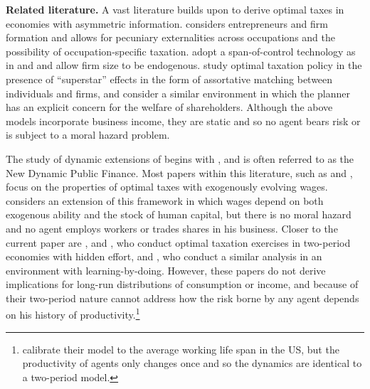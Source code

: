 \documentclass[11pt]{article}
\theoremstyle{plain}
\begin{document}


\textbf{Related literature.} A vast literature builds upon \cite{mirrlees_exploration_1971} to derive optimal taxes in economies with asymmetric information. \cite{scheuer_entrepreneurial_2014} considers entrepreneurs and firm formation and allows for pecuniary externalities across occupations and the possibility of occupation-specific taxation. \cite{ales_taxing_2017} adopt a span-of-control technology as in \cite{rosen_authority_1982} and \cite{lucas_size_1978} and allow firm size to be endogenous. \cite{scheuer_taxation_2017} study optimal taxation policy in the presence of ``superstar'' effects in the form of assortative matching between individuals and firms, and \cite{ales_taxing_2016} consider a similar environment in which the planner has an explicit concern for the welfare of shareholders. Although the above models incorporate business income, they are static and so no agent bears risk or is subject to a moral hazard problem. 

The study of dynamic extensions of \cite{mirrlees_exploration_1971} begins with \cite{golosov_optimal_2003}, and is often referred to as the New Dynamic Public Finance. Most papers within this literature, such as \cite{golosov_redistribution_2016} and \cite{farhi_insurance_2013}, focus on the properties of optimal taxes with exogenously evolving wages. \cite{stantcheva_optimal_2017} considers an extension of this framework in which wages depend on both exogenous ability and the stock of human capital, but there is no moral hazard and no agent employs workers or trades shares in his business. Closer to the current paper are \cite{albanesi_optimal_2006}, \cite{kapicka_optimal_2019} and \cite{best_optimal_2012}, who conduct optimal taxation exercises in two-period economies with hidden effort, and \cite{makris_taxation_2021}, who conduct a similar analysis in an environment with learning-by-doing. However, these papers do not derive implications for long-run distributions of consumption or income, and because of their two-period nature cannot address how the risk borne by any agent depends on his history of productivity.\footnote{\cite{makris_taxation_2021} calibrate their model to the average working life span in the US, but the productivity of agents only changes once and so the dynamics are identical to a two-period model.} 
\end{document}
